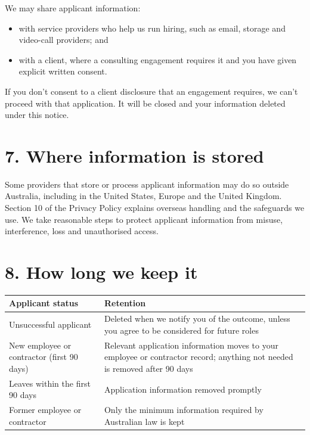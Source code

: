 \documentclass[11pt]{article}
\providecommand{\tightlist}{\setlength{\itemsep}{0pt}\setlength{\parskip}{0pt}}
\begin{document}
We may share applicant information:

\begin{itemize}
\tightlist
\item
  with service providers who help us run hiring, such as email, storage and video-call providers; and
\item
  with a client, where a consulting engagement requires it and you have given explicit written consent.
\end{itemize}

If you don't consent to a client disclosure that an engagement requires, we can't proceed with that application. It will be closed and your information deleted under this notice.

\section*{7. Where information is stored}

Some providers that store or process applicant information may do so outside Australia, including in the United States, Europe and the United Kingdom. Section 10 of the Privacy Policy explains overseas handling and the safeguards we use. We take reasonable steps to protect applicant information from misuse, interference, loss and unauthorised access.

\section*{8. How long we keep it}

{\def\LTcaptype{none} %
\begin{longtable}[]{@{}
  >{\raggedright\arraybackslash}p{}
  >{\raggedright\arraybackslash}p{}@{}}
\toprule\noalign{}
\begin{minipage}[b]{\linewidth}\raggedright
Applicant status
\end{minipage} & \begin{minipage}[b]{\linewidth}\raggedright
Retention
\end{minipage} \\
\midrule\noalign{}
\endhead
\bottomrule\noalign{}
\endlastfoot
Unsuccessful applicant & Deleted when we notify you of the outcome, unless you agree to be considered for future roles \\
New employee or contractor (first 90 days) & Relevant application information moves to your employee or contractor record; anything not needed is removed after 90 days \\
Leaves within the first 90 days & Application information removed promptly \\
Former employee or contractor & Only the minimum information required by Australian law is kept \\
\end{longtable}
}
\end{document}
